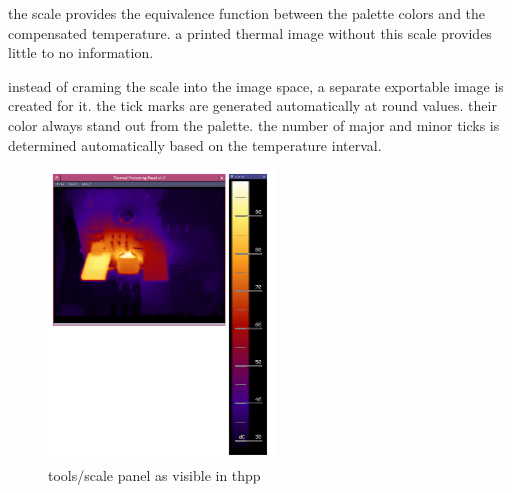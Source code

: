 \documentclass[12pt,twoside,a4paper,notitlepage]{report}
\begin{document}
the scale provides the equivalence function between the palette colors and the compensated temperature. a printed thermal image without this scale provides little to no information.

instead of craming the scale into the image space, a separate exportable image is created for it. the tick marks are generated automatically at round values. their color always stand out from the palette. the number of major and minor ticks is determined automatically based on the temperature interval.

\begin{figure}[ht]
 \centering
 \includegraphics[width=6cm, keepaspectratio=true]{img/tools_scale}
 \caption{tools/scale panel as visible in thpp}
 \label{fig:tools-scale}
\end{figure}
\end{document}
